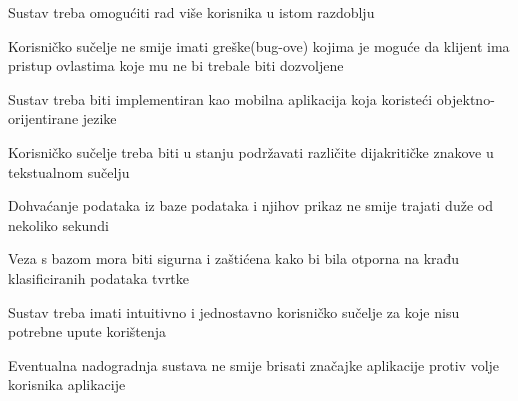 			 	\begin{packed_item}
			 	
			 	\item Sustav treba omogućiti rad više korisnika u istom razdoblju
			 	\item Korisničko sučelje ne smije imati greške(bug-ove) kojima je moguće da klijent ima pristup ovlastima koje mu ne bi trebale biti dozvoljene
			 	\item Sustav treba biti implementiran kao mobilna aplikacija koja koristeći objektno-orijentirane jezike
			 	\item Korisničko sučelje treba biti u stanju podržavati različite dijakritičke znakove u tekstualnom sučelju
			 	\item Dohvaćanje podataka iz baze podataka i njihov prikaz ne smije trajati duže od nekoliko sekundi
			 	\item Veza s bazom mora biti sigurna i zaštićena kako bi bila otporna na krađu klasificiranih podataka tvrtke
			 	\item Sustav treba imati intuitivno i jednostavno korisničko sučelje za koje nisu potrebne upute korištenja
			 	\item Eventualna nadogradnja sustava ne smije brisati značajke aplikacije protiv volje korisnika aplikacije
			 		
			 	\end{packed_item}
			 
			 
			 
	